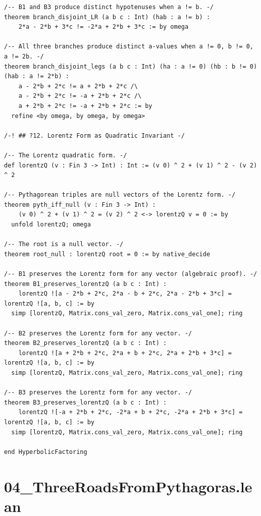 \documentclass[11pt,twoside,openright]{book}
\theoremstyle{definition}
\theoremstyle{remark}
\begin{document}
\begin{lstlisting}[style=lean]
/-- B1 and B3 produce distinct hypotenuses when a != b. -/
theorem branch_disjoint_LR (a b c : Int) (hab : a != b) :
    2*a - 2*b + 3*c != -2*a + 2*b + 3*c := by omega

/-- All three branches produce distinct a-values when a != 0, b != 0, a != 2b. -/
theorem branch_disjoint_legs (a b c : Int) (ha : a != 0) (hb : b != 0) (hab : a != 2*b) :
    a - 2*b + 2*c != a + 2*b + 2*c /\
    a - 2*b + 2*c != -a + 2*b + 2*c /\
    a + 2*b + 2*c != -a + 2*b + 2*c := by
  refine <by omega, by omega, by omega>

/-! ## ?12. Lorentz Form as Quadratic Invariant -/

/-- The Lorentz quadratic form. -/
def lorentzQ (v : Fin 3 -> Int) : Int := (v 0) ^ 2 + (v 1) ^ 2 - (v 2) ^ 2

/-- Pythagorean triples are null vectors of the Lorentz form. -/
theorem pyth_iff_null (v : Fin 3 -> Int) :
    (v 0) ^ 2 + (v 1) ^ 2 = (v 2) ^ 2 <-> lorentzQ v = 0 := by
  unfold lorentzQ; omega

/-- The root is a null vector. -/
theorem root_null : lorentzQ root = 0 := by native_decide

/-- B1 preserves the Lorentz form for any vector (algebraic proof). -/
theorem B1_preserves_lorentzQ (a b c : Int) :
    lorentzQ ![a - 2*b + 2*c, 2*a - b + 2*c, 2*a - 2*b + 3*c] = lorentzQ ![a, b, c] := by
  simp [lorentzQ, Matrix.cons_val_zero, Matrix.cons_val_one]; ring

/-- B2 preserves the Lorentz form for any vector. -/
theorem B2_preserves_lorentzQ (a b c : Int) :
    lorentzQ ![a + 2*b + 2*c, 2*a + b + 2*c, 2*a + 2*b + 3*c] = lorentzQ ![a, b, c] := by
  simp [lorentzQ, Matrix.cons_val_zero, Matrix.cons_val_one]; ring

/-- B3 preserves the Lorentz form for any vector. -/
theorem B3_preserves_lorentzQ (a b c : Int) :
    lorentzQ ![-a + 2*b + 2*c, -2*a + b + 2*c, -2*a + 2*b + 3*c] = lorentzQ ![a, b, c] := by
  simp [lorentzQ, Matrix.cons_val_zero, Matrix.cons_val_one]; ring

end HyperbolicFactoring

\end{lstlisting}

\clearpage

\section*{04\_ThreeRoadsFromPythagoras.lean}
\end{document}

